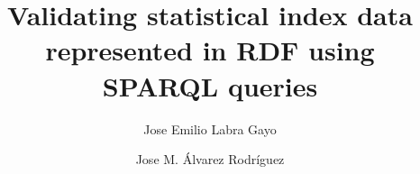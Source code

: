 \title{Validating statistical index data represented 
      in RDF using SPARQL queries} 
\author[Labra,Chema]
{Jose Emilio Labra Gayo %
\and 
Jose M. \'{A}lvarez Rodr\'{i}guez %
}
\date{}


